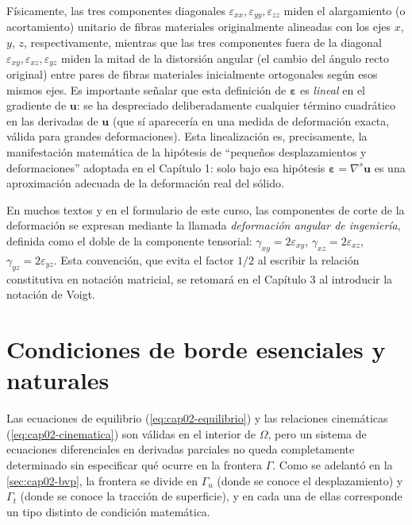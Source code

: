 Físicamente, las tres componentes diagonales $\varepsilon_{xx}, \varepsilon_{yy}, \varepsilon_{zz}$ miden el alargamiento (o acortamiento) unitario de fibras materiales originalmente alineadas con los ejes $x$, $y$, $z$, respectivamente, mientras que las tres componentes fuera de la diagonal $\varepsilon_{xy}, \varepsilon_{xz}, \varepsilon_{yz}$ miden la mitad de la distorsión angular (el cambio del ángulo recto original) entre pares de fibras materiales inicialmente ortogonales según esos mismos ejes. Es importante señalar que esta definición de $\bm\varepsilon$ es \emph{lineal} en el gradiente de $\bm u$: se ha despreciado deliberadamente cualquier término cuadrático en las derivadas de $\bm u$ (que sí aparecería en una medida de deformación exacta, válida para grandes deformaciones). Esta linealización es, precisamente, la manifestación matemática de la hipótesis de ``pequeños desplazamientos y deformaciones'' adoptada en el Capítulo 1: solo bajo esa hipótesis $\bm\varepsilon=\nabla^s\bm u$ es una aproximación adecuada de la deformación real del sólido.

\begin{observacion}
En muchos textos y en el formulario de este curso, las componentes de corte de la deformación se expresan mediante la llamada \emph{deformación angular de ingeniería}, definida como el doble de la componente tensorial: $\gamma_{xy}=2\varepsilon_{xy}$, $\gamma_{xz}=2\varepsilon_{xz}$, $\gamma_{yz}=2\varepsilon_{yz}$. Esta convención, que evita el factor $1/2$ al escribir la relación constitutiva en notación matricial, se retomará en el Capítulo 3 al introducir la notación de Voigt.
\end{observacion}

\section{Condiciones de borde esenciales y naturales}
\label{sec:cap02-condiciones-borde}

Las ecuaciones de equilibrio (\cref{eq:cap02-equilibrio}) y las relaciones cinemáticas (\cref{eq:cap02-cinematica}) son válidas en el interior de $\Omega$, pero un sistema de ecuaciones diferenciales en derivadas parciales no queda completamente determinado sin especificar qué ocurre en la frontera $\Gamma$. Como se adelantó en la \cref{sec:cap02-bvp}, la frontera se divide en $\Gamma_u$ (donde se conoce el desplazamiento) y $\Gamma_t$ (donde se conoce la tracción de superficie), y en cada una de ellas corresponde un tipo distinto de condición matemática.

